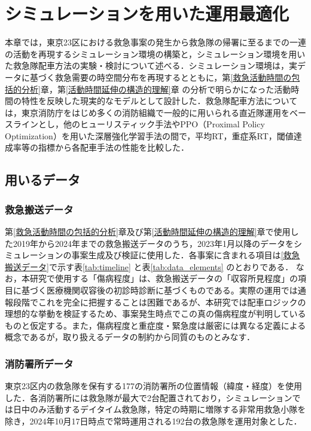 \chapter{シミュレーションを用いた運用最適化}
\label{シミュレーションを用いた運用最適化}
本章では，東京23区における救急事案の発生から救急隊の帰署に至るまでの一連の活動を再現するシミュレーション環境の構築と，シミュレーション環境を用いた救急隊配車方法の実験・検討について述べる．シミュレーション環境は，実データに基づく救急需要の時空間分布を再現するとともに，{第\ref{救急活動時間の包括的分析}章}，{第\ref{活動時間延伸の構造的理解}章}%
の分析で明らかになった活動時間の特性を反映した現実的なモデルとして設計した．救急隊配車方法については，東京消防庁をはじめ多くの消防組織で一般的に用いられる直近隊運用をベースラインとし，他のヒューリスティック手法やPPO（Proximal Policy Optimization）を用いた深層強化学習手法の間で，平均RT，重症系RT，閾値達成率等の指標から各配車手法の性能を比較した．

\section{用いるデータ}
\subsection{救急搬送データ}
{第\ref{救急活動時間の包括的分析}章}及び{第\ref{活動時間延伸の構造的理解}章}で使用した2019年から2024年までの救急搬送データのうち，2023年1月以降のデータをシミュレーションの事案生成及び検証に使用した．各事案に含まれる項目は\ref{救急搬送データ}で示す表\ref{tab:timeline} と表\ref{tab:data_elements} のとおりである．
なお，本研究で使用する「傷病程度」は、救急搬送データの「収容所見程度」の項目に基づく医療機関収容後の初診時診断に基づくものである。実際の運用では通報段階でこれを完全に把握することは困難であるが、本研究では配車ロジックの理想的な挙動を検証するため、事案発生時点でこの真の傷病程度が判明しているものと仮定する。また，傷病程度と重症度・緊急度は厳密には異なる定義による概念であるが\cite{kinkyu2004}，取り扱えるデータの制約から同質のものとみなす．

\subsection{消防署所データ}
東京23区内の救急隊を保有する177の消防署所の位置情報（緯度・経度）を使用した．各消防署所には救急隊が最大で2台配置されており，シミュレーションでは日中のみ活動するデイタイム救急隊，特定の時期に増隊する非常用救急小隊を除き，2024年10月17日時点で常時運用される192台の救急隊を運用対象とした．

